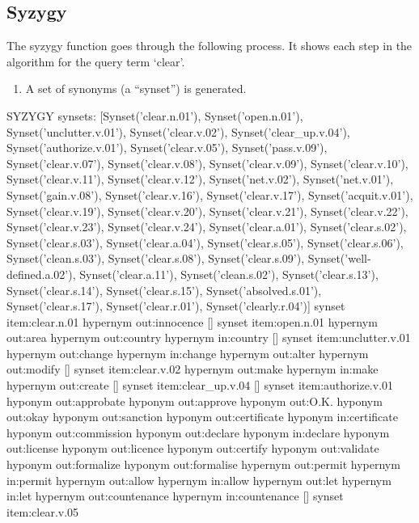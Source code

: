 \subsection{Syzygy}

The syzygy function goes through the following process.
It shows each step in the algorithm for the query term `clear'.
\begin{enumerate}
  \item A set of synonyms (a ``synset'') is generated.
\end{enumerate}

\begin{draft}
SYZYGY
synsets:
[Synset('clear.n.01'), Synset('open.n.01'), Synset('unclutter.v.01'), Synset('clear.v.02'), Synset('clear\_up.v.04'), Synset('authorize.v.01'), Synset('clear.v.05'), Synset('pass.v.09'), Synset('clear.v.07'), Synset('clear.v.08'), Synset('clear.v.09'), Synset('clear.v.10'), Synset('clear.v.11'), Synset('clear.v.12'), Synset('net.v.02'), Synset('net.v.01'), Synset('gain.v.08'), Synset('clear.v.16'), Synset('clear.v.17'), Synset('acquit.v.01'), Synset('clear.v.19'), Synset('clear.v.20'), Synset('clear.v.21'), Synset('clear.v.22'), Synset('clear.v.23'), Synset('clear.v.24'), Synset('clear.a.01'), Synset('clear.s.02'), Synset('clear.s.03'), Synset('clear.a.04'), Synset('clear.s.05'), Synset('clear.s.06'), Synset('clean.s.03'), Synset('clear.s.08'), Synset('clear.s.09'), Synset('well-defined.a.02'), Synset('clear.a.11'), Synset('clean.s.02'), Synset('clear.s.13'), Synset('clear.s.14'), Synset('clear.s.15'), Synset('absolved.s.01'), Synset('clear.s.17'), Synset('clear.r.01'), Synset('clearly.r.04')]
synset item:clear.n.01
hypernym out:innocence
[]
synset item:open.n.01
hypernym out:area
hypernym out:country
hypernym in:country
[]
synset item:unclutter.v.01
hypernym out:change
hypernym in:change
hypernym out:alter
hypernym out:modify
[]
synset item:clear.v.02
hypernym out:make
hypernym in:make
hypernym out:create
[]
synset item:clear\_up.v.04
[]
synset item:authorize.v.01
hyponym out:approbate
hyponym out:approve
hyponym out:O.K.
hyponym out:okay
hyponym out:sanction
hyponym out:certificate
hyponym in:certificate
hyponym out:commission
hyponym out:declare
hyponym in:declare
hyponym out:license
hyponym out:licence
hyponym out:certify
hyponym out:validate
hyponym out:formalize
hyponym out:formalise
hypernym out:permit
hypernym in:permit
hypernym out:allow
hypernym in:allow
hypernym out:let
hypernym in:let
hypernym out:countenance
hypernym in:countenance
[]
synset item:clear.v.05

\end{draft}
